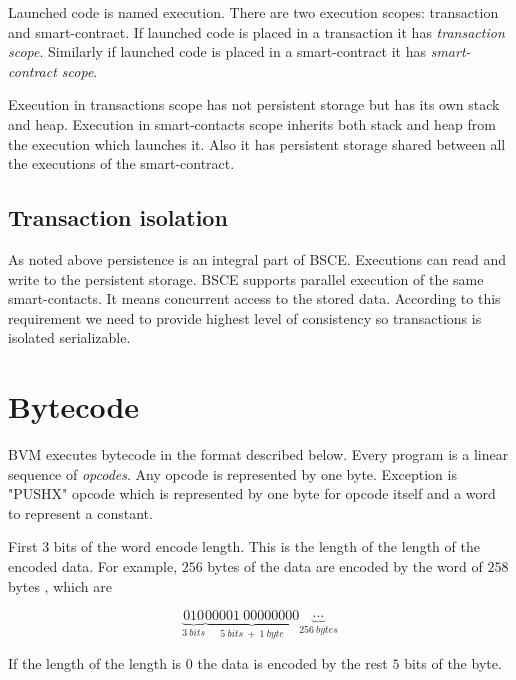 \documentclass[12pt,a4paper]{article}
\begin{document}
Launched code is named execution. There are two execution scopes: transaction and smart-contract. If launched code is placed in a transaction it has \textit{transaction scope}. Similarly if launched code is placed in a smart-contract it has \textit{smart-contract scope}.

Execution in transactions scope has not persistent storage but has its own stack and heap. Execution in smart-contacts scope inherits both stack and heap from the execution which launches it. Also it has persistent storage shared between all the executions of the smart-contract.

\subsection{Transaction isolation}

As noted above persistence is an integral part of BSCE. Executions can read and write to the persistent storage. BSCE supports parallel execution of the same smart-contacts. It means concurrent access to the stored data. According to this requirement we need to provide highest level of consistency so transactions is isolated serializable\cite{transaction-isolation}. 

\section{Bytecode}

BVM executes bytecode in the format described below. Every program is a linear sequence of \textit{opcodes}. Any opcode is represented by one byte. Exception is "PUSHX" opcode which is represented by one byte for opcode itself and a word to represent a constant.

First 3 bits of the word encode length. This is the length of the length of the encoded data. For example, $256$ bytes of the data are encoded by the word of $258$ bytes , which are

$$\underbrace{010}_{3~bits}\underbrace{00001~00000000}_{5~bits~+~1~byte} \underbrace{\cdots}_{256~bytes} $$

If the length of the length is 0 the data is encoded by the rest $5$ bits of the byte.
\end{document}
